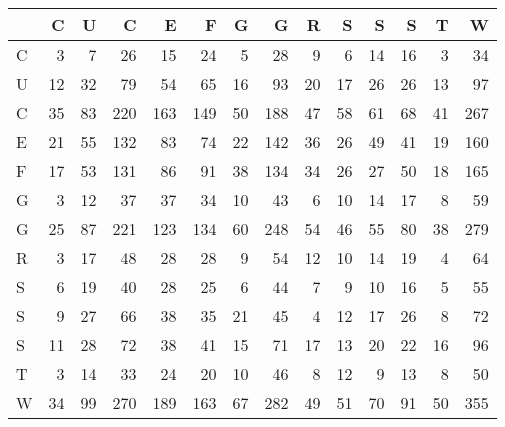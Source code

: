 \begin{tabular}{lrrrrrrrrrrrrr}
\toprule
{} &   C &   U &    C &    E &    F &   G &    G &   R &   S &   S &   S &   T &    W \\
\midrule
C &   3 &   7 &   26 &   15 &   24 &   5 &   28 &   9 &   6 &  14 &  16 &   3 &   34 \\
U &  12 &  32 &   79 &   54 &   65 &  16 &   93 &  20 &  17 &  26 &  26 &  13 &   97 \\
C &  35 &  83 &  220 &  163 &  149 &  50 &  188 &  47 &  58 &  61 &  68 &  41 &  267 \\
E &  21 &  55 &  132 &   83 &   74 &  22 &  142 &  36 &  26 &  49 &  41 &  19 &  160 \\
F &  17 &  53 &  131 &   86 &   91 &  38 &  134 &  34 &  26 &  27 &  50 &  18 &  165 \\
G &   3 &  12 &   37 &   37 &   34 &  10 &   43 &   6 &  10 &  14 &  17 &   8 &   59 \\
G &  25 &  87 &  221 &  123 &  134 &  60 &  248 &  54 &  46 &  55 &  80 &  38 &  279 \\
R &   3 &  17 &   48 &   28 &   28 &   9 &   54 &  12 &  10 &  14 &  19 &   4 &   64 \\
S &   6 &  19 &   40 &   28 &   25 &   6 &   44 &   7 &   9 &  10 &  16 &   5 &   55 \\
S &   9 &  27 &   66 &   38 &   35 &  21 &   45 &   4 &  12 &  17 &  26 &   8 &   72 \\
S &  11 &  28 &   72 &   38 &   41 &  15 &   71 &  17 &  13 &  20 &  22 &  16 &   96 \\
T &   3 &  14 &   33 &   24 &   20 &  10 &   46 &   8 &  12 &   9 &  13 &   8 &   50 \\
W &  34 &  99 &  270 &  189 &  163 &  67 &  282 &  49 &  51 &  70 &  91 &  50 &  355 \\
\bottomrule
\end{tabular}
